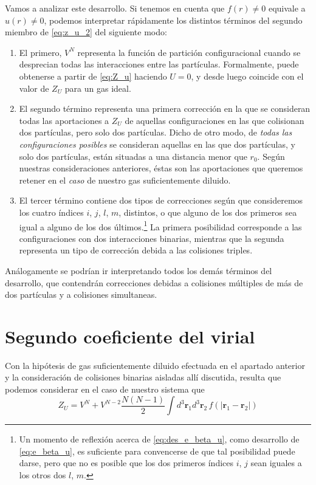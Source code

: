 Vamos a analizar este desarrollo. Si tenemos en cuenta que $f(r) \neq 0$ equivale a $u(r) \neq 0$, podemos interpretar rápidamente los distintos términos del segundo miembro de \eqref{eq:z_u_2} del siguiente modo:
\begin{enumerate}
	\item El primero, $V^N$ representa la función de partición configuracional cuando se desprecian todas las interacciones entre las partículas. Formalmente, puede	obtenerse a partir de \eqref{eq:Z_u} haciendo $U = 0$, y desde luego coincide con el valor de $Z_U$ para un gas ideal.
	
	\item El segundo término representa una primera corrección en la que se consideran todas las aportaciones a $Z_U$ de aquellas configuraciones en las que colisionan dos partículas, pero solo dos partículas. Dicho de otro modo, de \emph{todas las configuraciones posibles} se consideran aquellas en las que dos partículas, y solo dos partículas, están situadas a una distancia menor que $r_0$. Según nuestras consideraciones anteriores, éstas son las aportaciones que queremos retener en el \emph{caso} de nuestro gas suficientemente diluido.
	
	\item El tercer término contiene dos tipos de correcciones según que consideremos los cuatro índices $i$, $j$, $l$, $m$, distintos, o que alguno de los dos primeros sea igual a alguno de los dos últimos.\footnote{Un momento de reflexión acerca de \eqref{eq:des_e_beta_u}, como desarrollo de \eqref{eq:e_beta_u}, es suficiente para convencerse de que tal posibilidad puede darse, pero que no es posible que los dos primeros índices $i$, $j$ sean iguales a los otros dos $l$, $m$.} La primera posibilidad corresponde a las configuraciones con dos interacciones binarias, mientras que la segunda representa un tipo de corrección debida a las colisiones triples.
\end{enumerate}

Análogamente se podrían ir interpretando todos los demás términos del desarrollo, que contendrán correcciones debidas a colisiones múltiples de más de dos partículas y a colisiones simultaneas.

\section{Segundo coeficiente del virial}

Con la hipótesis de gas suficientemente diluido efectuada en el apartado anterior y la consideración de colisiones binarias aisladas allí discutida, resulta que podemos considerar en el caso de nuestro sistema que
\begin{equation}\label{eq:z_u_3}
	Z_U = V^N + V^{N-2} \frac{N(N-1)}{2}\int d^3\mathbf{r}_1 d^3\mathbf{r}_2 \, f(|\mathbf{r}_1 - \mathbf{r}_2|)
\end{equation}

